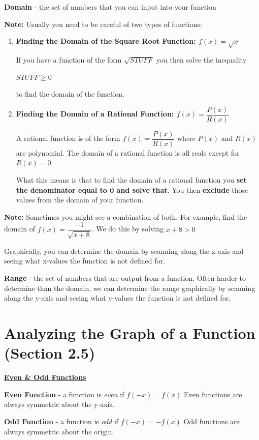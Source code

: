 \documentclass[12pt]{article}
\newenvironment{myindentpar}[1]%
     {\begin{list}{}%
             {\setlength{\leftmargin}{#1}}%
             \item[]%
     }
     {\end{list}}
\begin{document}
\textbf{Domain} - the set of numbers that you can input into your function

\begin{myindentpar}{1cm}
\textbf{Note:} Usually you need to be careful of two types of functions: 

\begin{enumerate}
\item \textbf{Finding the Domain of the Square Root Function: $f(x) = \sqrt{x}$} 

If you have a function of the form $\sqrt{STUFF}$ you then solve the inequality 
\newline

\centerline{$STUFF \geq 0$}

to find the domain of the function.


\item \textbf{Finding the Domain of a Rational Function:  $f(x) = \dfrac{P(x)}{R(x)}$}

 A rational function is of the form $f(x) = \dfrac{P(x)}{R(x)}$ where $P(x)$ and $R(x)$ are polynomial. The domain of a rational function is all reals except for $R(x)=0.$ 

What this means is that to find the domain of a rational function you \textbf{set the denominator equal to 0 and solve that}. You then \textbf{exclude} those values from the domain of your function.
\end{enumerate}

 \textbf{Note:} Sometimes you might see a combination of both. For example, find the domain of $f(x) = \dfrac{-1}{\sqrt{x+8}}$. We do this by solving $x+8>0$
\end{myindentpar}

Graphically, you can determine the domain by scanning along the x-axis and seeing what x-values the function is not defined for.

\textbf{Range} - the set of numbers that are output from a function. Often harder to determine than the domain, we can determine the range graphically by scanning along the y-axis and seeing what y-values the function is not defined for.

\section{Analyzing the Graph of a Function (Section 2.5)}

{\bf \underline{Even \& Odd Functions}}
\begin{myindentpar}{1cm}
\textbf{Even Function} - a function is \textit{even} if $f(-x) = f(x)$ Even functions are always symmetric about the y-axis.

\textbf{Odd Function} - a function is \textit{odd} if $f(-x) = -f(x)$ Odd functions are always symmetric about the origin.
\end{myindentpar}
\end{document}
